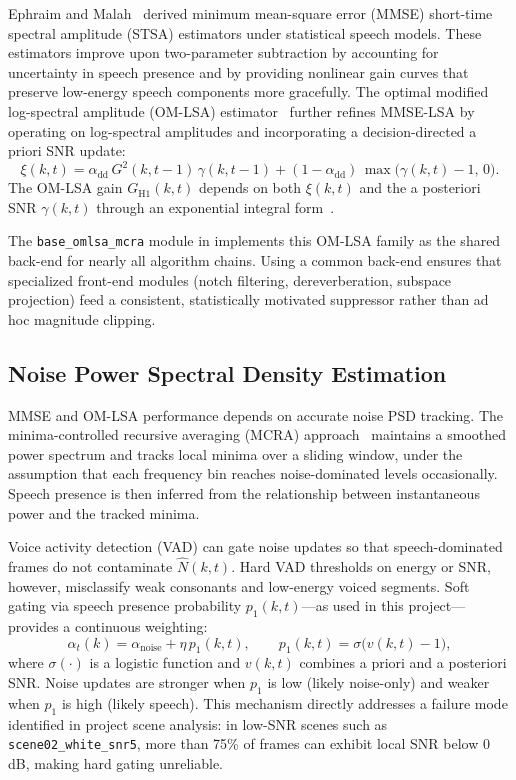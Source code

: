 Ephraim and Malah~\cite{ephraim1984} derived minimum mean-square error (MMSE) short-time spectral amplitude (STSA) estimators under statistical speech models. These estimators improve upon two-parameter subtraction by accounting for uncertainty in speech presence and by providing nonlinear gain curves that preserve low-energy speech components more gracefully. The optimal modified log-spectral amplitude (OM-LSA) estimator~\cite{ephraim2005} further refines MMSE-LSA by operating on log-spectral amplitudes and incorporating a decision-directed a priori SNR update:
\begin{equation}
  \xi(k,t) = \alpha_{\mathrm{dd}}\, G^2(k,t{-}1)\, \gamma(k,t{-}1)
           + (1-\alpha_{\mathrm{dd}})\, \max\bigl(\gamma(k,t)-1,\,0\bigr).
  \label{eq:dd_xi_bg}
\end{equation}
The OM-LSA gain $G_{\mathrm{H1}}(k,t)$ depends on both $\xi(k,t)$ and the a posteriori SNR $\gamma(k,t)$ through an exponential integral form~\cite{ephraim2005,loizou2013}.

The \texttt{base\_omlsa\_mcra} module in \projectshort{} implements this OM-LSA family as the shared back-end for nearly all algorithm chains. Using a common back-end ensures that specialized front-end modules (notch filtering, dereverberation, subspace projection) feed a consistent, statistically motivated suppressor rather than ad hoc magnitude clipping.

\subsection{Noise Power Spectral Density Estimation}
\label{sec:noise_psd}

MMSE and OM-LSA performance depends on accurate noise PSD tracking. The minima-controlled recursive averaging (MCRA) approach~\cite{loizou2013} maintains a smoothed power spectrum and tracks local minima over a sliding window, under the assumption that each frequency bin reaches noise-dominated levels occasionally. Speech presence is then inferred from the relationship between instantaneous power and the tracked minima.

Voice activity detection (VAD) can gate noise updates so that speech-dominated frames do not contaminate $\hat{N}(k,t)$. Hard VAD thresholds on energy or SNR, however, misclassify weak consonants and low-energy voiced segments. Soft gating via speech presence probability $p_1(k,t)$---as used in this project---provides a continuous weighting:
\begin{equation}
  \alpha_t(k) = \alpha_{\mathrm{noise}} + \eta\, p_1(k,t), \qquad
  p_1(k,t) = \sigma\!\bigl(v(k,t)-1\bigr),
\end{equation}
where $\sigma(\cdot)$ is a logistic function and $v(k,t)$ combines a priori and a posteriori SNR. Noise updates are stronger when $p_1$ is low (likely noise-only) and weaker when $p_1$ is high (likely speech). This mechanism directly addresses a failure mode identified in project scene analysis: in low-SNR scenes such as \texttt{scene02\_white\_snr5}, more than 75\% of frames can exhibit local SNR below 0\,dB, making hard gating unreliable.

